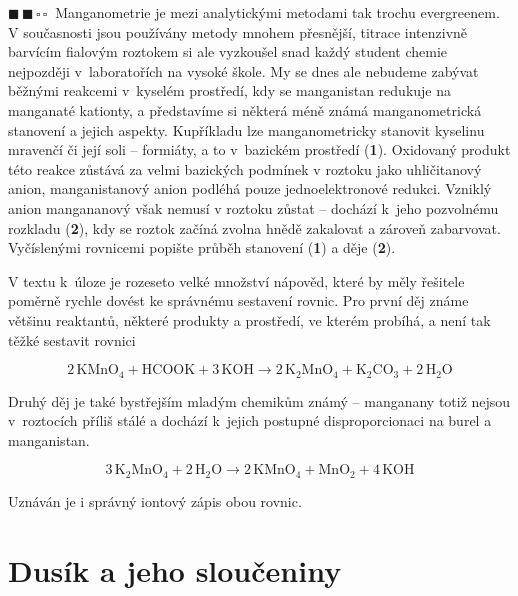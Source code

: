\documentclass{book}
\newcommand{\dva}{$\blacksquare \, \blacksquare \, \square \, \square \; \; $}
\renewenvironment{quotation}{\par}{\par} %
\begin{document}
\hrulefill %
\begin{quotation}
\dva Manganometrie je mezi analytickými metodami tak trochu evergreenem.
V současnosti jsou používány metody mnohem přesnější, titrace intenzivně
barvícím fialovým roztokem si ale vyzkoušel snad každý student chemie
nejpozději v~laboratořích na vysoké škole. My se dnes ale nebudeme
zabývat běžnými reakcemi v~kyselém prostředí, kdy se manganistan redukuje
na manganaté kationty, a představíme si některá méně známá manganometrická
stanovení a jejich aspekty. Kupříkladu lze manganometricky stanovit
kyselinu mravenčí či její soli -- formiáty, a to v~bazickém prostředí
(\textbf{1}). Oxidovaný produkt této reakce zůstává za velmi bazických podmínek
v roztoku jako uhličitanový anion, manganistanový anion podléhá pouze
jednoelektronové redukci. Vzniklý anion mangananový však nemusí v
roztoku zůstat -- dochází k~jeho pozvolnému rozkladu (\textbf{2}), kdy se
roztok začíná zvolna hnědě zakalovat a zároveň zabarvovat.\\Vyčíslenými
rovnicemi popište průběh stanovení (\textbf{1}) a děje (\textbf{2}). 
\end{quotation} \dotfill \par 
V textu k~úloze je rozeseto velké množství nápověd, které by měly
řešitele poměrně rychle dovést ke správnému sestavení rovnic. Pro
první děj známe většinu reaktantů, některé produkty a prostředí, ve
kterém probíhá, a není tak těžké sestavit rovnici

\[
\mathrm{2\,KMnO_{4}+HCOOK+3\,KOH\rightarrow2\,K_{2}MnO_{4}+K_{2}CO_{3}+2\,H_{2}O}
\]

Druhý děj je také bystřejším mladým chemikům známý -- manganany totiž
nejsou v~roztocích příliš stálé a dochází k~jejich postupné disproporcionaci
na burel a manganistan.

\[
\mathrm{3\,K_{2}MnO_{4}+2\,H_{2}O\rightarrow2\,KMnO_{4}+MnO_{2}+4\,KOH}
\]

Uznáván je i správný iontový zápis obou rovnic. 

\newpage %
\section{Dusík a jeho sloučeniny}
\end{document}

